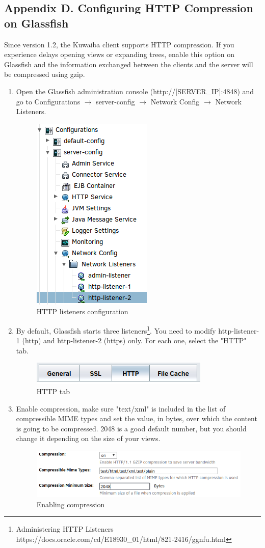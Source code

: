 \documentclass[a4paper]{article}
\begin{document}
\begin{appendices}
			\section{Appendix D. Configuring HTTP Compression on Glassfish} \label{app:AppendixD}
				Since version 1.2, the Kuwaiba client supports HTTP compression. If you experience delays opening views or expanding trees, enable this option on Glassfish and the information exchanged between the clients and the server will be compressed using gzip.
				\begin{enumerate}
					\item Open the Glassfish administration console (http://[SERVER\_IP]:4848) and go to Configurations $\rightarrow$ server-config $\rightarrow$ Network Config $\rightarrow$ Network Listeners.\\
					\begin{figure}[h!]
						\centering
						\includegraphics[width=0.2\linewidth]{img/gf_configurations_server_config.png} 	
						\caption{HTTP listeners configuration}
						\label{fig:listeners-config}
					\end{figure}
					\item By default, Glassfish starts three listeners\footnote{Administering HTTP Listeners https://docs.oracle.com/cd/E18930\_01/html/821-2416/ggnfu.html}. You need to modify http-listener-1 (http) and http-listener-2 (https) only. For each one, select the "HTTP" tab.
					\begin{figure}[h!]
						\centering
						\includegraphics[width=0.4\linewidth]{img/gf_edit_http_listener.png} 	
						\caption{HTTP tab}
						\label{fig:http-tab}
					\end{figure}
					\item Enable compression, make sure "text/xml" is included in the list of compressible MIME types and set the value, in bytes, over which the content is going to be compressed. 2048 is a good default number, but you should change it depending on the size of your views.
					\begin{figure}[h!]
						\centering
						\includegraphics[width=0.7\linewidth]{img/gf_enable_compression.png} 	
						\caption{Enabling compression}
						\label{fig:enabling-compression}
					\end{figure}
				\end{enumerate}
			\newpage

\end{appendices}
\end{document}
